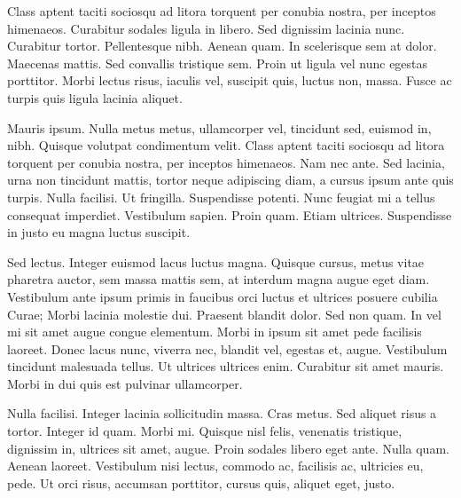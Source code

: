 Class aptent taciti sociosqu ad litora torquent per conubia nostra, per
inceptos himenaeos. Curabitur sodales ligula in libero. Sed dignissim
lacinia nunc. Curabitur tortor. Pellentesque nibh. Aenean quam. In
scelerisque sem at dolor. Maecenas mattis. Sed convallis tristique sem.
Proin ut ligula vel nunc egestas porttitor. Morbi lectus risus, iaculis
vel, suscipit quis, luctus non, massa. Fusce ac turpis quis ligula
lacinia aliquet.

Mauris ipsum. Nulla metus metus, ullamcorper vel, tincidunt sed, euismod
in, nibh. Quisque volutpat condimentum velit. Class aptent taciti
sociosqu ad litora torquent per conubia nostra, per inceptos himenaeos.
Nam nec ante. Sed lacinia, urna non tincidunt mattis, tortor neque
adipiscing diam, a cursus ipsum ante quis turpis. Nulla facilisi. Ut
fringilla. Suspendisse potenti. Nunc feugiat mi a tellus consequat
imperdiet. Vestibulum sapien. Proin quam. Etiam ultrices. Suspendisse in
justo eu magna luctus suscipit.

Sed lectus. Integer euismod lacus luctus magna. Quisque cursus, metus
vitae pharetra auctor, sem massa mattis sem, at interdum magna augue
eget diam. Vestibulum ante ipsum primis in faucibus orci luctus et
ultrices posuere cubilia Curae; Morbi lacinia molestie dui. Praesent
blandit dolor. Sed non quam. In vel mi sit amet augue congue elementum.
Morbi in ipsum sit amet pede facilisis laoreet. Donec lacus nunc,
viverra nec, blandit vel, egestas et, augue. Vestibulum tincidunt
malesuada tellus. Ut ultrices ultrices enim. Curabitur sit amet mauris.
Morbi in dui quis est pulvinar ullamcorper.

Nulla facilisi. Integer lacinia sollicitudin massa. Cras metus. Sed
aliquet risus a tortor. Integer id quam. Morbi mi. Quisque nisl felis,
venenatis tristique, dignissim in, ultrices sit amet, augue. Proin
sodales libero eget ante. Nulla quam. Aenean laoreet. Vestibulum nisi
lectus, commodo ac, facilisis ac, ultricies eu, pede. Ut orci risus,
accumsan porttitor, cursus quis, aliquet eget, justo.
